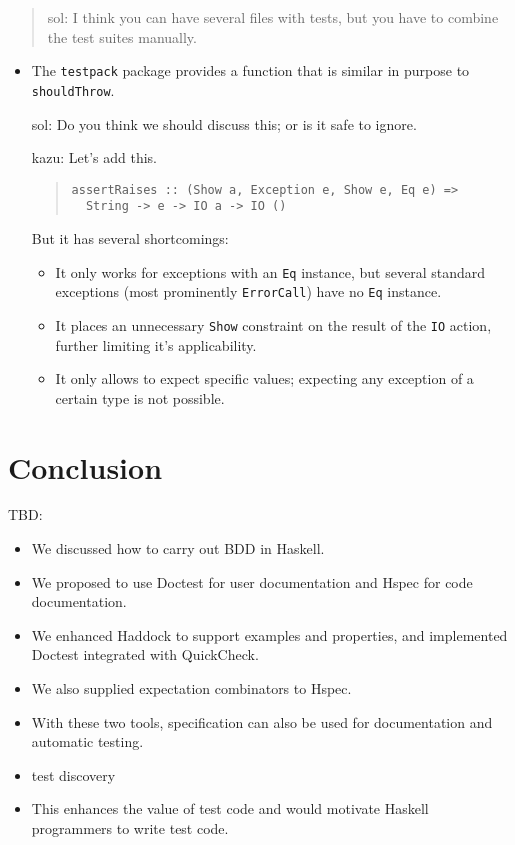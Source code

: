 \documentclass[preprint]{sigplanconf}
\begin{document}
\begin{quote}
    sol: I think you can have several files with tests, but you have
    to combine the test suites manually.
\end{quote}


\begin{itemize}
    \item The {\tt testpack} package provides a function that is
        similar in purpose to {\tt shouldThrow}.

        sol: Do you think we should discuss this; or is it safe to
        ignore.

        kazu: Let's add this.

\begin{quote}
\small
\begin{verbatim}
assertRaises :: (Show a, Exception e, Show e, Eq e) =>
  String -> e -> IO a -> IO ()
\end{verbatim}\end{quote}
        But it has several shortcomings:
        \begin{itemize}
            \item
                It only works for exceptions with an {\tt Eq}
                instance, but several standard exceptions (most
                prominently {\tt ErrorCall}) have no {\tt Eq}
                instance.
            \item
                It places an unnecessary {\tt Show} constraint on the
                result of the {\tt IO} action, further limiting it's
                applicability.
            \item
                It only allows to expect specific values; expecting
                any exception of a certain type is not possible.
        \end{itemize}
\end{itemize}

\section{Conclusion}

TBD:

\begin{itemize}
\item We discussed how to carry out BDD in Haskell.
\item We proposed to use Doctest for user documentation
and Hspec for code documentation.
\item We enhanced Haddock to support examples and properties, 
and implemented Doctest integrated with QuickCheck.
\item We also supplied expectation combinators to Hspec.
\item With these two tools, specification can also be used for
documentation and automatic testing.
\item test discovery
\item This enhances the value of test code and would motivate
Haskell programmers to write test code.
\end{itemize}
\end{document}
